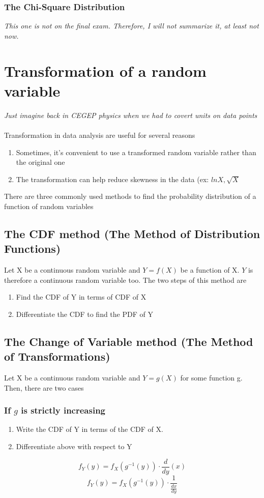 \documentclass{article}
\begin{document}
\subsubsection{The Chi-Square Distribution}
\textit{This one is not on the final exam. Therefore, I will not summarize it, at least not now.}
\section{Transformation of a random variable}
\textit{Just imagine back in CEGEP physics when we had to covert units on data points}\\\\
Transformation in data analysis are useful for several reasons
\begin{enumerate}
    \item Sometimes, it's convenient to use a transformed random variable rather than the original one
    \item The transformation can help reduce skewness in the data (ex: $lnX, \sqrt{X}$
\end{enumerate}
There are three commonly used methods to find the probability distribution of a function of random variables
\subsection{The CDF method (The Method of Distribution Functions)}
Let X be a continuous random variable and $Y=f(X)$ be a function of X. $Y$ is therefore a continuous random variable too. The two steps of this method are
\begin{enumerate}
    \item Find the CDF of Y in terms of CDF of X
    \item Differentiate the CDF to find the PDF of Y
\end{enumerate}
\subsection{The Change of Variable method (The Method of Transformations)}
Let X be a continuous random variable and $Y=g(X)$ for some function g. Then, there are two cases
\subsubsection{If $g$ is strictly increasing}
\begin{enumerate}
    \item Write the CDF of Y in terms of the CDF of X.
    \item Differentiate above with respect to Y
\end{enumerate}
\[f_Y(y)=f_X(g^{-1}(y))\cdot\frac{d}{dy}(x)\]
\[f_Y(y)=f_X(g^{-1}(y))\cdot\frac{1}{\frac{dx}{dy}}\]
\end{document}
